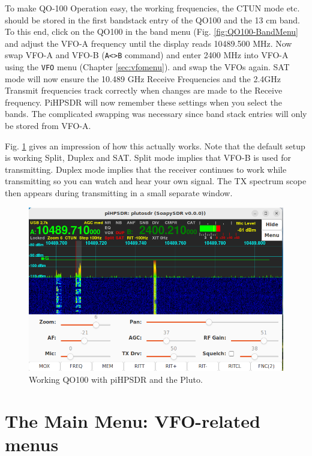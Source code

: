 \documentclass[12pt]{book}
\def\bltt#1{\texttt{\color{blue}#1}}
\begin{document}
To make QO-100 Operation easy, the working frequencies, the CTUN mode etc. should be
stored in the first bandstack entry of the QO100 and the 13 cm band. To this end,
click on the QO100 in the band menu (Fig. \ref{fig:QO100-BandMenu} and adjust the VFO-A
frequency until the display reads 10489.500 MHz. Now swap VFO-A and VFO-B (\bltt{A<>B} command)
and enter 2400 MHz into VFO-A using the \bltt{VFO} menu (Chapter \ref{sec:vfomenu}). and
swap the VFOs again. SAT mode will now ensure the 10.489 GHz Receive
 Frequencies and the 2.4GHz Transmit frequencies track correctly when changes are made
 to the Receive frequency. PiHPSDR will now remember these settings when you select
 the bands. The complicated swapping was necessary since band stack entries will
 only be stored from VFO-A.

Fig. \ref{fig:QO100-Waterfall} gives an impression of how this actually works. Note that the
default setup
is working Split, Duplex and SAT. Split mode implies that VFO-B is used for transmitting.
Duplex mode implies that the receiver continues to work while transmitting so you can watch 
and hear your own signal.
The TX spectrum scope then appears during transmitting in a small separate window.
\begin{figure}[ht]
\center
\includegraphics[width=12cm]{QO100-Waterfall.png}
\caption{Working QO100 with piHPSDR and the Pluto.}
\label{fig:QO100-Waterfall}
\end{figure}
\chapter{The Main Menu: VFO-related menus}
\end{document}
